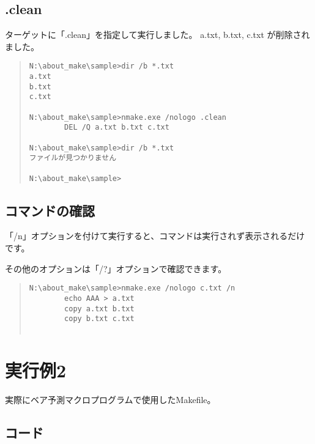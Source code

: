 \documentclass[dvipdfmx]{jsarticle}
\begin{document}
\subsection{.clean}
ターゲットに「.clean」を指定して実行しました。
a.txt, b.txt, c.txt が削除されました。

\begin{quote}
\begin{verbatim}
N:\about_make\sample>dir /b *.txt
a.txt
b.txt
c.txt

N:\about_make\sample>nmake.exe /nologo .clean
        DEL /Q a.txt b.txt c.txt

N:\about_make\sample>dir /b *.txt
ファイルが見つかりません

N:\about_make\sample>

\end{verbatim}
\end{quote}

\subsection{コマンドの確認}
「/n」オプションを付けて実行すると、コマンドは実行されず表示されるだけです。\par
その他のオプションは「/?」オプションで確認できます。

\begin{quote}
\begin{verbatim}
N:\about_make\sample>nmake.exe /nologo c.txt /n
        echo AAA > a.txt
        copy a.txt b.txt
        copy b.txt c.txt
        
\end{verbatim}
\end{quote}


\section{実行例2}

実際にベア予測マクロプログラムで使用したMakefile。

\subsection{コード}
\end{document}
